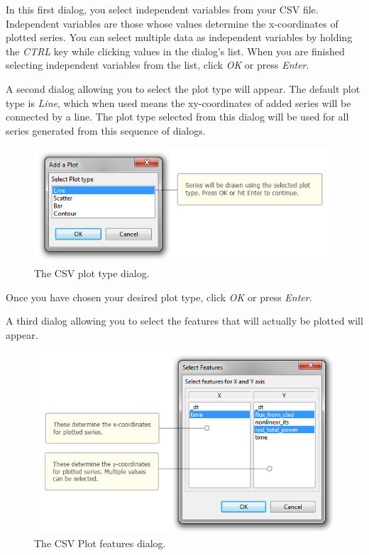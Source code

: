 In this first dialog, you select independent variables from your CSV
file. Independent variables are those whose values determine the
x-coordinates of plotted series. You can select multiple data as
independent variables by holding the \emph{CTRL} key while clicking
values in the dialog's list. When you are finished selecting independent
variables from the list, click \emph{OK} or press \emph{Enter}.

A second dialog allowing you to select the plot type will appear. The
default plot type is \emph{Line}, which when used means the
xy-coordinates of added series will be connected by a line. The plot
type selected from this dialog will be used for all series generated
from this sequence of dialogs.

\begin{figure}[htbp]
\centering
\includegraphics[scale=.6]{figures/ICE_CSVAddPlotDialog-PlotTypes.png}
\caption{The CSV plot type dialog.}
\end{figure}

Once you have chosen your desired plot type, click \emph{OK} or press
\emph{Enter}.

A third dialog allowing you to select the features that will actually be
plotted will appear.

\begin{figure}[htbp]
\centering
\includegraphics[width=\textwidth]{figures/ICE_CSVAddPlotDialog-Features.png}
\caption{ The CSV Plot features dialog.  }
\end{figure}

